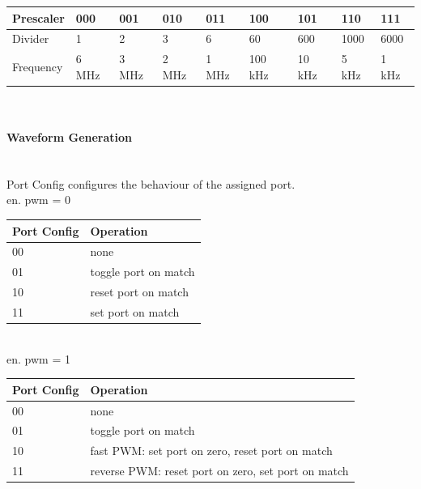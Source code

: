 { %
\begin{tabular}{|p{20mm}|p{14mm}|p{14mm}|p{14mm}|p{14mm}|p{14mm}|p{14mm}|p{14mm}|p{14mm}|}
    \rowcolor{gray!50}
    \hline
    Prescaler & 000 & 001 & 010 & 011 & 100 & 101 & 110 & 111 \\
    \hline
    Divider & 1 & 2 & 3 & 6 & 60 & 600 & 1000 & 6000 \\
    \hline
    Frequency & 6 MHz & 3 MHz & 2 MHz & 1 MHz & 100 kHz & 10 kHz & 5 kHz & 1 kHz\\
    \hline
\end{tabular}~\\

\paragraph{Waveform Generation}~\\
Port Config configures the behaviour of the assigned port.\\

en. pwm = 0\\
\begin{tabular}{|p{20mm}|p{100mm}|}
    \rowcolor{gray!50}
    \hline
    Port Config & Operation\\\hline
    00 & none \\ \hline
    01 & toggle port on match \\ \hline
    10 & reset port on match \\ \hline
    11 & set port on match \\ \hline
\end{tabular}\\

en. pwm = 1\\
\begin{tabular}{|p{20mm}|p{100mm}|}
    \rowcolor{gray!50}
    \hline
    Port Config & Operation\\\hline
    00 & none \\ \hline
    01 & toggle port on match \\ \hline
    10 & fast PWM: set port on zero, reset port on match \\ \hline
    11 & reverse PWM: reset port on zero, set port on match\\ \hline
\end{tabular}
}